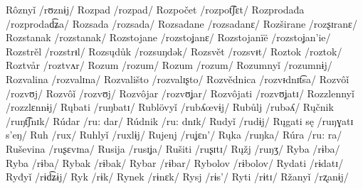 Rôznyǐ /rʊznɨj/
Rozpad /rozpad/
Rozpočet /rozpot͡ʃɛt/
Rozprodađa /rozprodad͡ʑa/
Rozsada /rozsada/
Rozsadane /rozsadanɛ/
Rozširane /rozʂɪranɛ/
Rozstanak /rozstanak/
Rozstojane /rozstoʝanɛ/
Rozstojanïë /rozstoʝan’ie/
Rozstrěl /rozstrᵻl/
Rozsųdůk /rozsuŋdək/
Rozsvět /rozsvᵻt/
Roztok /roztok/
Roztvår /roztvʌr/
Rozum /rozum/
Rozum /rozum/
Rozumnyǐ /rozumnɨj/
Rozvalina /rozvalɪna/
Rozvališto /rozvalɪʂto/
Rozvědnica /rozvᵻdnɪt͡sa/
Rozvôǐ /rozvʊj/
Rozvôǐ /rozvʊj/
Rozvôjar /rozvʊʝar/
Rozvôjati /rozvʊʝatɪ/
Rozzlennyǐ /rozzlɛnnɨj/
Rųbati /ruŋbatɪ/
Rublövyǐ /rubʎœvɨj/
Rubůlj /rubəʎ/
Rųčnik /ruŋt͡ʃnɪk/
Rúdar /ru: dar/
Rúdnik /ru: dnɪk/
Rudyǐ /rudɨj/
Rųgati sę /ruŋɣatɪ s’eŋ/
Ruh /rux/
Ruhlyǐ /ruxlɨj/
Rujenj /ruʝɛn’/
Rųka /ruŋka/
Rúra /ru: ra/
Ruševina /ruʂɛvɪna/
Rusija /rusɪʝa/
Rušiti /ruʂɪtɪ/
Rųžj /ruŋʒ/
Ryba /rɨba/
Ryba /rɨba/
Rybak /rɨbak/
Rybar /rɨbar/
Rybolov /rɨbolov/
Rydati /rɨdatɪ/
Ryđyǐ /rɨd͡ʑɨj/
Ryk /rɨk/
Rynek /rɨnɛk/
Rysj /rɨs’/
Ryti /rɨtɪ/
Ržanyǐ /rʐanɨj/